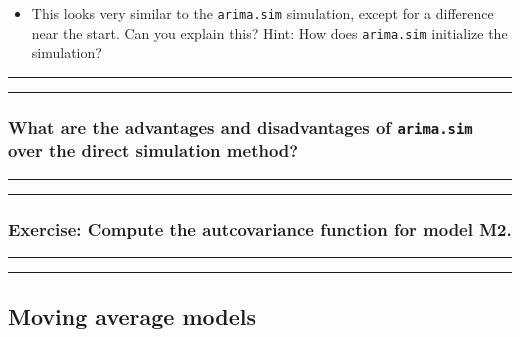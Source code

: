 \documentclass[]{article}
\providecommand{\tightlist}{%
  \setlength{\itemsep}{0pt}\setlength{\parskip}{0pt}}
\begin{document}
\begin{itemize}
\tightlist
\item
  This looks very similar to the \texttt{arima.sim} simulation, except
  for a difference near the start. Can you explain this? Hint: How does
  \texttt{arima.sim} initialize the simulation?
\end{itemize}

\begin{center}\rule{0.5\linewidth}{\linethickness}\end{center}

\begin{center}\rule{0.5\linewidth}{\linethickness}\end{center}

\subsubsection{\texorpdfstring{What are the advantages and disadvantages
of \texttt{arima.sim} over the direct simulation
method?}{What are the advantages and disadvantages of arima.sim over the direct simulation method?}}\label{what-are-the-advantages-and-disadvantages-of-arima.sim-over-the-direct-simulation-method}

\begin{center}\rule{0.5\linewidth}{\linethickness}\end{center}

\begin{center}\rule{0.5\linewidth}{\linethickness}\end{center}

\subsubsection{Exercise: Compute the autcovariance function for model
M2.}\label{exercise-compute-the-autcovariance-function-for-model-m2.}

\begin{center}\rule{0.5\linewidth}{\linethickness}\end{center}

\begin{center}\rule{0.5\linewidth}{\linethickness}\end{center}

\subsection{Moving average models}\label{moving-average-models}
\end{document}
